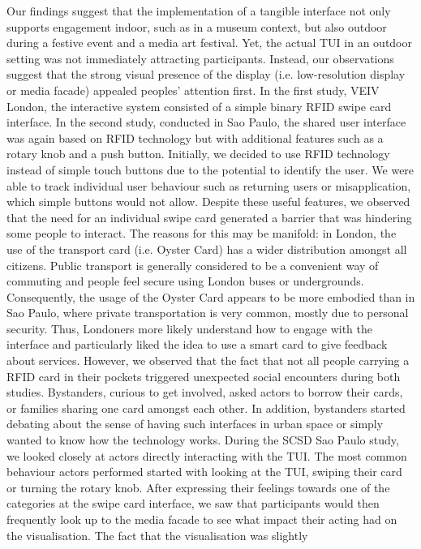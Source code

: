 Our findings suggest that the implementation of a tangible interface not only supports
engagement indoor, such as in a museum context, but also outdoor during a
festive event and a media art festival. Yet, the actual TUI in an outdoor setting was
not immediately attracting participants. Instead, our observations suggest that the
strong visual presence of the display (i.e. low-resolution display or media facade)
appealed peoples’ attention first.
In the first study, VEIV London, the interactive system consisted of a simple
binary RFID swipe card interface. In the second study, conducted in Sao Paulo,
the shared user interface was again based on RFID technology but with additional
features such as a rotary knob and a push button. Initially, we decided to use RFID
technology instead of simple touch buttons due to the potential to identify the user.
We were able to track individual user behaviour such as returning users or misapplication,
which simple buttons would not allow. Despite these useful features,
we observed that the need for an individual swipe card generated a barrier that
was hindering some people to interact. The reasons for this may be manifold: in
London, the use of the transport card (i.e. Oyster Card) has a wider distribution
amongst all citizens. Public transport is generally considered to be a convenient
way of commuting and people feel secure using London buses or undergrounds.
Consequently, the usage of the Oyster Card appears to be more embodied than in
Sao Paulo, where private transportation is very common, mostly due to personal
security. Thus, Londoners more likely understand how to engage with the interface
and particularly liked the idea to use a smart card to give feedback about
services. However, we observed that the fact that not all people carrying a RFID
card in their pockets triggered unexpected social encounters during both studies.
Bystanders, curious to get involved, asked actors to borrow their cards, or families
sharing one card amongst each other. In addition, bystanders started debating
about the sense of having such interfaces in urban space or simply wanted to know
how the technology works.
During the SCSD Sao Paulo study, we looked closely at actors directly interacting
with the TUI. The most common behaviour actors performed started with
looking at the TUI, swiping their card or turning the rotary knob. After expressing
their feelings towards one of the categories at the swipe card interface, we saw that
participants would then frequently look up to the media facade to see what impact
their acting had on the visualisation. The fact that the visualisation was slightly
